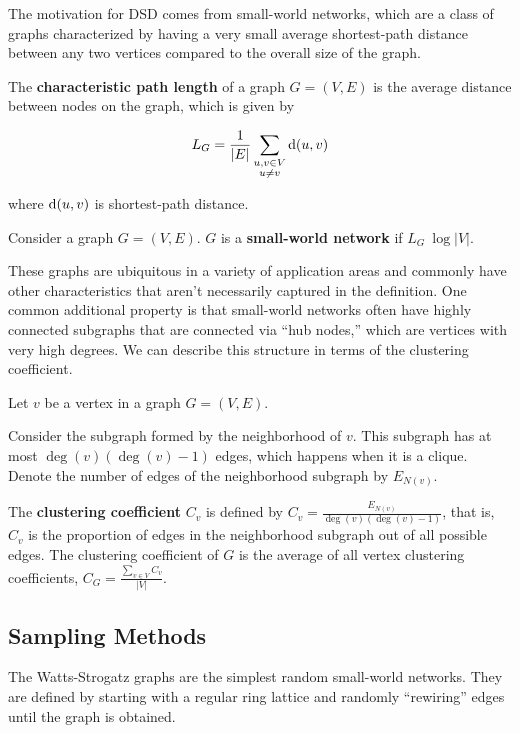 The motivation for DSD comes from small-world networks, which are a class of
graphs characterized by having a very small average shortest-path distance
between any two vertices compared to the overall size of the graph.


\begin{definition}
  The \textbf{characteristic path length} of a graph $G = (V,E)$ is the average distance
  between nodes on the graph, which is given by

  \[ L_G = \frac{1}{|E|} \sum_{\substack{u,v \in V \\ u \neq v}} \mathrm{d}(u,v)\]

  where $\mathrm{d}(u,v)$ is shortest-path distance. 
\end{definition}

\begin{definition}
  Consider a graph $G = (V,E)$. $G$ is a \textbf{small-world network} if
  $L_G ~ \log{|V|}$.
\end{definition}


These graphs are ubiquitous in a variety of application areas and commonly have
other characteristics that aren't necessarily captured in the definition. One
common additional property is that small-world networks often have highly
connected subgraphs that are connected via ``hub nodes,'' which are vertices
with very high degrees. We can describe this structure in terms of the
clustering coefficient.

\begin{definition}
  Let $v$ be a vertex in a graph $G = (V,E)$.

  Consider the subgraph formed by the neighborhood of $v$. This subgraph has at
  most $\deg(v)(\deg(v) - 1)$ edges, which happens when it is a clique. Denote
  the number of edges of the neighborhood subgraph by $E_{N(v)}$.

  The \textbf{clustering coefficient} $C_v$ is defined by
  $C_v = \frac{E_{N(v)}}{\deg(v)(\deg(v) - 1)}$, that is, $C_v$ is the
  proportion of edges in the neighborhood subgraph out of all possible edges.
  The clustering coefficient of $G$ is the average of all vertex clustering
  coefficients, $C_G = \frac{\sum_{v \in V}{C_v}}{|V|}$.
\end{definition}


\subsection{Sampling Methods}

The Watts-Strogatz graphs are the simplest random small-world networks. They are
defined by starting with a regular ring lattice and randomly ``rewiring'' edges
until the graph is obtained.

